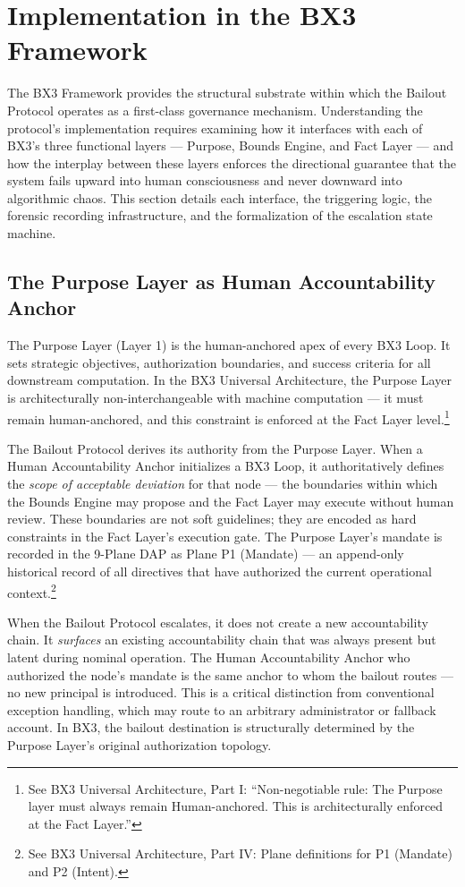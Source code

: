\section{Implementation in the BX3 Framework}

The BX3 Framework provides the structural substrate within which the Bailout Protocol operates as a first-class governance mechanism. Understanding the protocol's implementation requires examining how it interfaces with each of BX3's three functional layers --- Purpose, Bounds Engine, and Fact Layer --- and how the interplay between these layers enforces the directional guarantee that the system fails upward into human consciousness and never downward into algorithmic chaos. This section details each interface, the triggering logic, the forensic recording infrastructure, and the formalization of the escalation state machine.

\subsection{The Purpose Layer as Human Accountability Anchor}

The Purpose Layer (Layer 1) is the human-anchored apex of every BX3 Loop. It sets strategic objectives, authorization boundaries, and success criteria for all downstream computation. In the BX3 Universal Architecture, the Purpose Layer is architecturally non-interchangeable with machine computation --- it must remain human-anchored, and this constraint is enforced at the Fact Layer level.\footnote{See BX3 Universal Architecture, Part I: ``Non-negotiable rule: The Purpose layer must always remain Human-anchored. This is architecturally enforced at the Fact Layer.''}

The Bailout Protocol derives its authority from the Purpose Layer. When a Human Accountability Anchor initializes a BX3 Loop, it authoritatively defines the \emph{scope of acceptable deviation} for that node --- the boundaries within which the Bounds Engine may propose and the Fact Layer may execute without human review. These boundaries are not soft guidelines; they are encoded as hard constraints in the Fact Layer's execution gate. The Purpose Layer's mandate is recorded in the 9-Plane DAP as Plane P1 (Mandate) --- an append-only historical record of all directives that have authorized the current operational context.\footnote{See BX3 Universal Architecture, Part IV: Plane definitions for P1 (Mandate) and P2 (Intent).}

When the Bailout Protocol escalates, it does not create a new accountability chain. It \emph{surfaces} an existing accountability chain that was always present but latent during nominal operation. The Human Accountability Anchor who authorized the node's mandate is the same anchor to whom the bailout routes --- no new principal is introduced. This is a critical distinction from conventional exception handling, which may route to an arbitrary administrator or fallback account. In BX3, the bailout destination is structurally determined by the Purpose Layer's original authorization topology.


